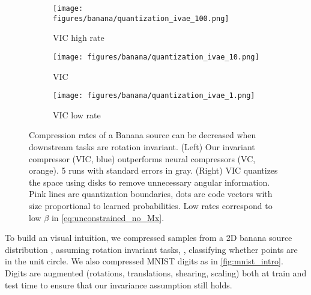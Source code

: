 \documentclass[final]{article}
\begin{document}
\begin{figure}
\begin{minipage}{.48\linewidth}
     
     \begin{subfigure}{0.32\columnwidth}
         \centering
         \texttt{[image: figures/banana/quantization\_ivae\_100.png]}
         \vspace{-1.3em}
         \caption{VIC high rate}
         \label{fig:bananas_sweepivae_100}
     \end{subfigure}
     \begin{subfigure}{0.32\columnwidth}
         \centering
         \texttt{[image: figures/banana/quantization\_ivae\_10.png]}
         \vspace{-1.3em}
         \caption{VIC }
         \label{fig:bananas_sweepivae_10}
     \end{subfigure}
     \begin{subfigure}{0.32\columnwidth}
         \centering
         \texttt{[image: figures/banana/quantization\_ivae\_1.png]}
         \vspace{-1.3em}
         \caption{VIC low rate }
         \label{fig:bananas_sweepivae_1}
     \end{subfigure}
     \end{minipage}
\caption{
Compression rates of a Banana source \cite{balle_nonlinear_2020} can be decreased when downstream tasks are rotation invariant. 
(Left) Our invariant compressor (VIC, blue) outperforms neural compressors (VC, orange). 5 runs with standard errors in gray.
(Right) VIC quantizes the space using disks to remove unnecessary angular information.
Pink lines are quantization boundaries, dots are code vectors with size proportional to learned probabilities.
Low rates correspond to low $\beta$ in \cref{eq:unconstrained_no_Mx}.
}
\label{fig:bananas_sweeps}
\vspace{-1\baselineskip}
\end{figure}
To build an visual intuition, we compressed samples from a 2D banana source distribution \cite{balle_nonlinear_2020}, assuming rotation invariant tasks, \eg, classifying whether points are in the unit circle.
We also compressed MNIST digits as in \cref{fig:mnist_intro}.
Digits are augmented (rotations, translations, shearing, scaling) both at train and test time to ensure that our invariance assumption still holds.
\end{document}
